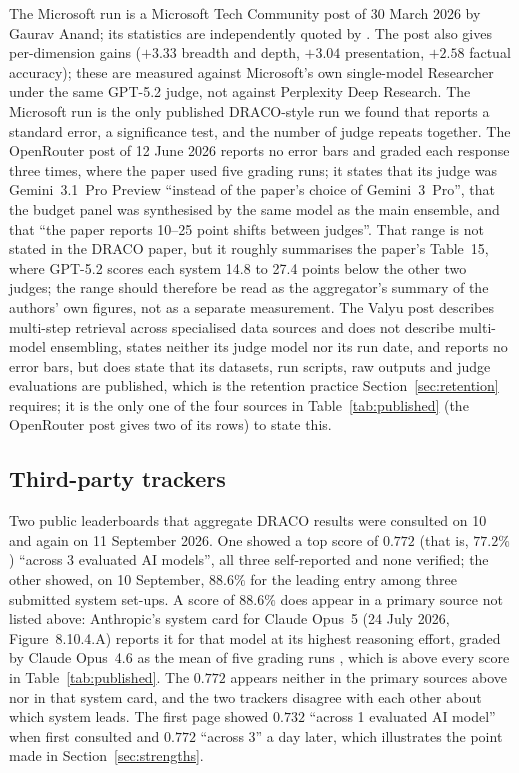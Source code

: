 \documentclass[11pt]{article}
\begin{document}
The Microsoft run \citep{msftdraco2026} is a Microsoft Tech Community post of
30 March 2026 by Gaurav Anand; its statistics are independently quoted by
\citet{computerworld2026msft}. The post also gives per-dimension gains ($+3.33$
breadth and depth, $+3.04$ presentation, $+2.58$ factual accuracy); these are
measured against Microsoft's own single-model Researcher under the same GPT-5.2 judge,
not against Perplexity Deep Research. The Microsoft run is the only
published DRACO-style run we found that reports a standard error, a significance test,
and the number of judge repeats together. The OpenRouter post \citep{openrouterfusion2026}
of 12 June 2026 reports no error bars and graded each response three times, where the paper used five grading runs; it states that its judge was Gemini~3.1~Pro
Preview ``instead of the paper's choice of Gemini~3~Pro'', that the budget panel was
synthesised by the same model as the main ensemble, and that ``the paper reports 10--25
point shifts between judges''. That range is not stated in the DRACO paper, but it roughly summarises the paper's Table~15, where GPT-5.2 scores each system 14.8 to 27.4 points below the other two judges; the
range should therefore be read as the aggregator's summary of the authors' own figures, not as a separate measurement. The Valyu post \citep{valyu2026} describes
multi-step retrieval across specialised data sources and does not describe multi-model
ensembling, states neither its judge model nor its run date, and reports no error bars,
but does state that its datasets, run scripts, raw outputs and judge evaluations are published, which is the retention practice Section~\ref{sec:retention} requires; it is the only one of the four sources in Table~\ref{tab:published} (the OpenRouter post gives two of its rows) to state this.

\subsection{Third-party trackers}

Two public leaderboards that aggregate DRACO results were consulted on 10 and again on
11 September 2026.
One \citep{llmstatsdraco} showed a top score of $0.772$ (that is, $77.2\%$) ``across 3 evaluated AI models'',
all three self-reported and none verified; the other \citep{benchlmdraco} showed, on 10 September, $88.6\%$
for the leading entry among three submitted system set-ups. A score of $88.6\%$ does appear in a primary source not listed above: Anthropic's system card for Claude Opus~5 (24 July 2026, Figure~8.10.4.A) reports it for that model at its highest reasoning effort, graded by Claude Opus~4.6 as the mean of five grading runs \citep{anthropic2026opus5}, which is above every score in Table~\ref{tab:published}. The $0.772$ appears neither in the primary sources above nor in that system card, and the two trackers disagree with each other about which
system leads. The first page showed $0.732$ ``across 1 evaluated AI model'' when first consulted and $0.772$ ``across 3'' a day later, which illustrates the point made in Section~\ref{sec:strengths}.
\end{document}
